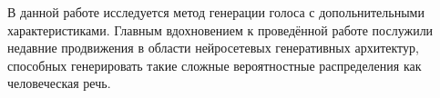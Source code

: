 
% 
        
    \label{sections/introduction}
    
    В данной работе исследуется метод генерации голоса с допольнительными характеристиками.
    Главным вдохновением к проведённой работе послужили недавние продвижения в области нейросетевых  генеративных архитектур, способных генерировать такие сложные вероятностные распределения как человеческая речь\cite{article:van2016wavenet}.

    
    
    
    
    
    
